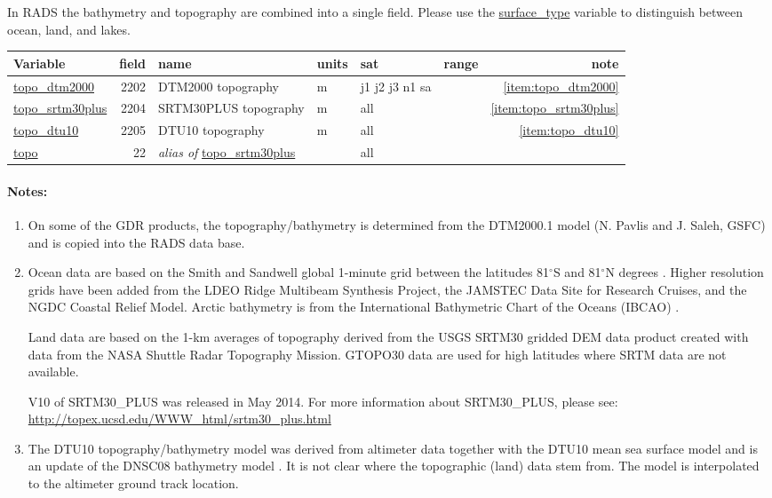 \documentclass[a4paper,11pt,openany,natbib,nomargin]{thesis}
\makeatletter
\renewcommand\deg{\ensuremath{^\circ}}
\newcommand\var[1]{\url{#1}\index{variables!#1@\protect\url{#1}}}
\newcommand\alias[1]{\emph{alias of} \var{#1}}
\newenvironment{vartable}{
\begin{table}[ht]
\small
\begin{tabular}{lrllllr}
\hline
Variable & field & name & units & sat & range & note \\
\hline
}{
\hline
\end{tabular}
\end{table}
}
\newenvironment{notes}[1][Notes:]{\FloatBarrier\paragraph{#1}\begin{enumerate}}{\end{enumerate}}
\makeatother
\begin{document}
In RADS the bathymetry and topography are combined into a single field. Please use the \var{surface_type} variable to distinguish between ocean, land, and lakes.

\begin{vartable}
\var{topo_dtm2000}    & 2202 & DTM2000 topography    & m & j1 j2 j3 n1 sa          & & \ref{item:topo_dtm2000} \\
\var{topo_srtm30plus} & 2204 & SRTM30PLUS topography & m & all & & \ref{item:topo_srtm30plus} \\
\var{topo_dtu10}      & 2205 & DTU10 topography      & m & all & & \ref{item:topo_dtu10} \\
\hline
\var{topo}            & 22 & \alias{topo_srtm30plus} && all && \\
\end{vartable}


\begin{notes}
\item On some of the GDR products, the topography/bathymetry is determined from the DTM2000.1 model (N. Pavlis and J. Saleh, GSFC) and is copied into the RADS data base.\label{item:topo_dtm2000}
\item
Ocean data are based on the Smith and Sandwell global 1-minute grid between the latitudes 81$\deg$S and 81$\deg$N degrees \citep{sandwell2014b}. Higher resolution grids have been added from the LDEO Ridge Multibeam Synthesis Project, the JAMSTEC Data Site for Research Cruises, and the NGDC Coastal Relief Model. Arctic bathymetry is from the International Bathymetric Chart of the Oceans (IBCAO) \citep{jakobsson2012}.

Land data are based on the 1-km averages of topography derived from the USGS SRTM30 gridded DEM data product created with data from the NASA Shuttle Radar Topography Mission. GTOPO30 data are used for high latitudes where SRTM data are not available.

V10 of SRTM30\_PLUS was released in May 2014.
For more information about SRTM30\_PLUS, please see:
\url{http://topex.ucsd.edu/WWW_html/srtm30_plus.html}
\label{item:topo_srtm30plus}
\item The DTU10 topography/bathymetry model was derived from altimeter data together with the DTU10 mean sea surface model \citep{andersen2010} and is an update of the DNSC08 bathymetry model \citep{andersen2009a}. It is not clear where the topographic (land) data stem from. The model is interpolated to the altimeter ground track location.\label{item:topo_dtu10}
\end{notes}
\end{document}
